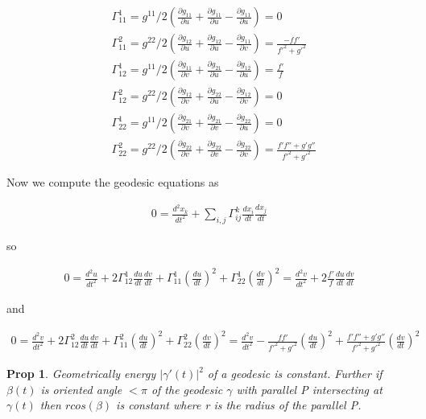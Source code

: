 \documentclass[11pt]{article}
\newcommand{\del}{\partial}
\newtheorem{prop}{Prop}
\begin{document}
\begin{align*}
	&\Gamma_{11}^1 = g^{11}/2(\frac{\del g_{11}}{\del u} + \frac{\del g_{11}}{\del u} - \frac{\del g_{11}}{\del u}) = 0 \\ 
	& \Gamma_{11}^2 = g^{22}/2(\frac{\del g_{12}}{\del u} + \frac{\del g_{12}}{\del u} - \frac{\del g_{11}}{\del v}) = \frac{-ff'}{f'^2+g'^2} \\
	& \Gamma_{12}^1 = g^{11}/2(\frac{\del g_{11}}{\del v} + \frac{\del g_{21}}{\del u} - \frac{\del g_{12}}{\del u}) = \frac{f'}{f}\\
	& \Gamma_{12}^2 = g^{22}/2(\frac{\del g_{12}}{\del v} + \frac{\del g_{22}}{\del u} - \frac{\del g_{12}}{\del v}) = 0 \\
	& \Gamma_{22}^1 = g^{11}/2(\frac{\del g_{21}}{\del v} + \frac{\del g_{21}}{\del v} - \frac{\del g_{22}}{\del u}) = 0\\
	& \Gamma_{22}^2 = g^{22}/2(\frac{\del g_{22}}{\del v} + \frac{\del g_{22}}{\del v} - \frac{\del g_{22}}{\del v}) = \frac{f'f''+g'g''}{f'^2+g'^2}
\end{align*}

Now we compute the geodesic equations as 

\begin{align*}
	0 = \frac{d^2x_k}{dt^2}+\sum_{i,j}\Gamma_{ij}^k \frac{dx_i}{dt}\frac{dx_j}{dt}
\end{align*}

so

\begin{align*}
	0 = \frac{d^2u}{dt^2} + 2\Gamma_{12}^1\frac{du}{dt}\frac{dv}{dt}+\Gamma_{11}^1(\frac{du}{dt})^2+\Gamma_{22}^1(\frac{dv}{dt})^2 = \frac{d^2v}{dt^2} + 2\frac{f'}{f}\frac{du}{dt}\frac{dv}{dt} 
\end{align*}

and

\begin{align*}
	 0 = \frac{d^2v}{dt^2} + 2\Gamma_{12}^2\frac{du}{dt}\frac{dv}{dt}+\Gamma_{11}^2(\frac{du}{dt})^2+\Gamma_{22}^2(\frac{dv}{dt})^2 = \frac{d^2v}{dt^2} -\frac{ff'}{f'^2+g'^2}(\frac{du}{dt})^2+\frac{f'f''+g'g''}{f'^2+g'^2}(\frac{dv}{dt})^2
\end{align*}
\begin{prop}
	Geometrically energy $|\gamma'(t)|^2$ of a geodesic is constant. Further if $\beta(t)$ is oriented angle $< \pi$ of the geodesic $\gamma$ with parallel P intersecting at $\gamma(t)$ then $r cos(\beta)$ is constant where r is the radius of the parallel P. 
\end{prop}
\end{document}
